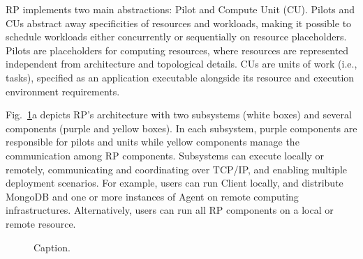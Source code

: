 \documentclass[preprint,12pt, a4paper]{elsarticle}
\begin{document}
RP implements two main abstractions: Pilot and Compute Unit (CU). Pilots and
CUs abstract away specificities of resources and workloads, making it
possible to schedule workloads either concurrently or sequentially on
resource placeholders. Pilots are placeholders for computing resources, where
resources are represented independent from architecture and topological
details. CUs are units of work (i.e., tasks), specified as an application
executable alongside its resource and execution environment requirements.

Fig.~\ref{fig:archs}a depicts RP's architecture with two subsystems (white
boxes) and several components (purple and yellow boxes). In each subsystem,
purple components are responsible for pilots and units while yellow
components manage the communication among RP components. Subsystems can
execute locally or remotely, communicating and coordinating over TCP/IP\@,
and enabling multiple deployment scenarios. For example, users can run Client
locally, and distribute MongoDB and one or more instances of Agent on remote
computing infrastructures. Alternatively, users can run all RP components on
a local or remote resource.

\begin{figure}
    \centering
    \qquad
    \caption{Caption. }\label{fig:archs}
\end{figure}
\end{document}

